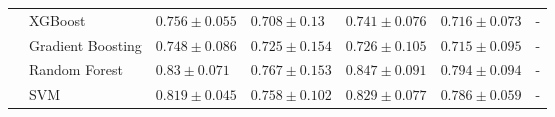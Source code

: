 \documentclass[12pt,a4paper]{standalone}
\begin{document}
\begin{tabular}{lllllll}
                                    & XGBoost           & $0.756 \pm 0.055$                             & $0.708 \pm 0.13$                              & $0.741 \pm 0.076$                             & $0.716 \pm 0.073$                             & - \\ \nopagebreak
                                    & Gradient Boosting & $0.748 \pm 0.086$                             & $0.725 \pm 0.154$                             & $0.726 \pm 0.105$                             & $0.715 \pm 0.095$                             & - \\ \nopagebreak
                                    & Random Forest     & \cellcolor{gray!50}$0.83 \pm 0.071$           & \cellcolor{gray!50}$0.767 \pm 0.153$          & \cellcolor{gray!50}$0.847 \pm 0.091$          & \cellcolor{gray!50}$0.794 \pm 0.094$          & - \\ \nopagebreak
                                    & SVM               & $0.819 \pm 0.045$                             & $0.758 \pm 0.102$                             & $0.829 \pm 0.077$                             & $0.786 \pm 0.059$                             & - \\ \midrule
\end{tabular}
\end{document}
